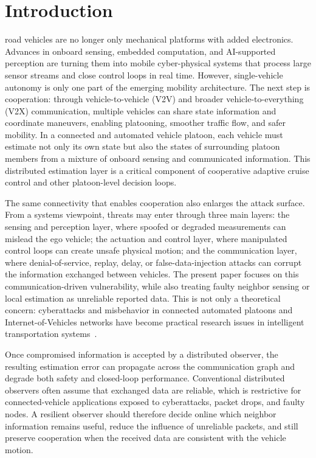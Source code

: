 \documentclass[letterpaper,journal]{IEEEtran}
\begin{document}
\section{Introduction}\label{sec_introduction}
 road vehicles are no longer only mechanical platforms with added electronics. Advances in onboard sensing, embedded computation, and AI-supported perception are turning them into mobile cyber-physical systems that process large sensor streams and close control loops in real time. However, single-vehicle autonomy is only one part of the emerging mobility architecture. The next step is cooperation: through vehicle-to-vehicle (V2V) and broader vehicle-to-everything (V2X) communication, multiple vehicles can share state information and coordinate maneuvers, enabling platooning, smoother traffic flow, and safer mobility. In a connected and automated vehicle platoon, each vehicle must estimate not only its own state but also the states of surrounding platoon members from a mixture of onboard sensing and communicated information. This distributed estimation layer is a critical component of cooperative adaptive cruise control and other platoon-level decision loops.

The same connectivity that enables cooperation also enlarges the attack surface. From a systems viewpoint, threats may enter through three main layers: the sensing and perception layer, where spoofed or degraded measurements can mislead the ego vehicle; the actuation and control layer, where manipulated control loops can create unsafe physical motion; and the communication layer, where denial-of-service, replay, delay, or false-data-injection attacks can corrupt the information exchanged between vehicles. The present paper focuses on this communication-driven vulnerability, while also treating faulty neighbor sensing or local estimation as unreliable reported data. This is not only a theoretical concern: cyberattacks and misbehavior in connected automated platoons and Internet-of-Vehicles networks have become practical research issues in intelligent transportation systems~\cite{C_IDM,mousavinejad2019distributed,siddiqui2023trust_vehicles}.

Once compromised information is accepted by a distributed observer, the resulting estimation error can propagate across the communication graph and degrade both safety and closed-loop performance. Conventional distributed observers often assume that exchanged data are reliable, which is restrictive for connected-vehicle applications exposed to cyberattacks, packet drops, and faulty nodes. A resilient observer should therefore decide online which neighbor information remains useful, reduce the influence of unreliable packets, and still preserve cooperation when the received data are consistent with the vehicle motion.
\end{document}
